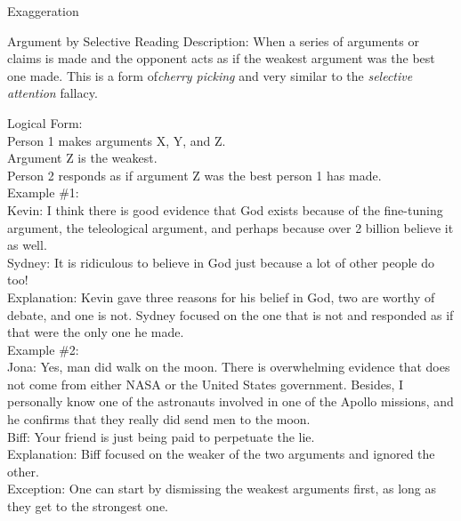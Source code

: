 \documentclass[a4paper,12pt,single,pdftex]{scrartcl}
\begin{document}
Exaggeration

Argument by Selective Reading
    Description: When a series of arguments or claims is made and the opponent acts as if the weakest argument was the best one made. This is a form of{\it  cherry picking }and very similar to the {\it selective attention }fallacy.

    
      Logical Form:
    \\

    
      Person 1 makes arguments X, Y, and Z.
    \\

    
      Argument Z is the weakest.
    \\

    
      Person 2 responds as if argument Z was the best person 1 has made.
    \\

    
      Example \#1:
    \\

    
      Kevin: I think there is good evidence that God exists because of the fine-tuning argument, the teleological argument, and perhaps because over 2 billion believe it as well.
    \\

    
      Sydney: It is ridiculous to believe in God just because a lot of other people do too!
    \\

    
      Explanation: Kevin gave three reasons for his belief in God, two are worthy of debate, and one is not. Sydney focused on the one that is not and responded as if that were the only one he made.
    \\

    
      Example \#2:
    \\

    
      Jona: Yes, man did walk on the moon. There is overwhelming evidence that does not come from either NASA or the United States government. Besides, I personally know one of the astronauts involved in one of the Apollo missions, and he confirms that they really did send men to the moon.
    \\

    
      Biff: Your friend is just being paid to perpetuate the lie.
    \\

    
      Explanation: Biff focused on the weaker of the two arguments and ignored the other.
    \\

    
      Exception: One can start by dismissing the weakest arguments first, as long as they get to the strongest one.
    \\
\end{document}
